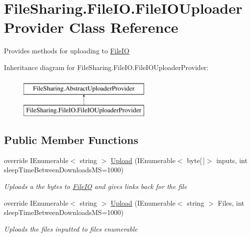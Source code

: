 \hypertarget{class_file_sharing_1_1_file_i_o_1_1_file_i_o_uploader_provider}{}\section{File\+Sharing.\+File\+I\+O.\+File\+I\+O\+Uploader\+Provider Class Reference}
\label{class_file_sharing_1_1_file_i_o_1_1_file_i_o_uploader_provider}


Provides methods for uploading to \hyperlink{namespace_file_sharing_1_1_file_i_o}{File\+IO}  


Inheritance diagram for File\+Sharing.\+File\+I\+O.\+File\+I\+O\+Uploader\+Provider\+:\begin{figure}[H]
\begin{center}
\leavevmode
\includegraphics[height=2.000000cm]{class_file_sharing_1_1_file_i_o_1_1_file_i_o_uploader_provider}
\end{center}
\end{figure}
\subsection*{Public Member Functions}
\begin{DoxyCompactItemize}
\item 
override I\+Enumerable$<$ string $>$ \hyperlink{class_file_sharing_1_1_file_i_o_1_1_file_i_o_uploader_provider_adf0c3382f1c092923de4b2ee6a039923}{Upload} (I\+Enumerable$<$ byte\mbox{[}$\,$\mbox{]}$>$ inputs, int sleep\+Time\+Between\+Downloads\+MS=1000)
\begin{DoxyCompactList}\small\item\em Uploads a the bytes to \hyperlink{namespace_file_sharing_1_1_file_i_o}{File\+IO} and gives links back for the file \end{DoxyCompactList}\item 
override I\+Enumerable$<$ string $>$ \hyperlink{class_file_sharing_1_1_file_i_o_1_1_file_i_o_uploader_provider_ab60ebd0e31c88f5d365249d59f81e9fd}{Upload} (I\+Enumerable$<$ string $>$ Files, int sleep\+Time\+Between\+Downloads\+MS=1000)
\begin{DoxyCompactList}\small\item\em Uploads the files inputted to files enumerable \end{DoxyCompactList}\end{DoxyCompactItemize}
